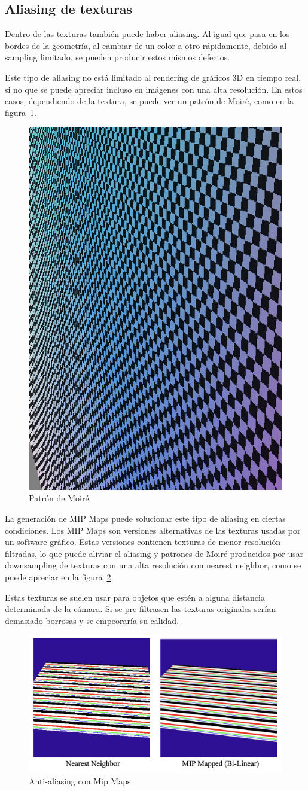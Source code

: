 \documentclass[withindex, glossary]{cam-thesis}
\begin{document}
\subsection{Aliasing de texturas}

Dentro de las texturas también puede haber aliasing. Al igual que pasa en los bordes de la geometría, al cambiar de un color a otro rápidamente, debido al sampling limitado, se pueden producir estos mismos defectos.

Este tipo de aliasing no está limitado al rendering de gráficos 3D en tiempo real, si no que se puede apreciar incluso en imágenes con una alta resolución. En estos casos, dependiendo de la textura, se puede ver un patrón de Moiré, como en la figura~\ref{moire}.

\begin{figure}[!htbp]
    \includegraphics[width=.3\linewidth]{figures/moire.png}
    \caption{Patrón de Moiré\cite{studysupersampling}\label{moire}}
\end{figure}

La generación de MIP Maps puede solucionar este tipo de aliasing en ciertas condiciones. Los MIP Maps son versiones alternativas de las texturas usadas por un software gráfico. Estas versiones contienen texturas de menor resolución filtradas, lo que puede aliviar el aliasing y patrones de Moiré producidos por usar downsampling de texturas con una alta resolución con nearest neighbor, como se puede apreciar en la figura~\ref{mipmaps}.

Estas texturas se suelen usar para objetos que estén a alguna distancia determinada de la cámara. Si se pre-filtrasen las texturas originales serían demasiado borrosas y se empeoraría su calidad.

\begin{figure}[!htbp]
    \includegraphics[width=.8\linewidth]{figures/mipmaps.png}
    \caption{Anti-aliasing con Mip Maps\label{mipmaps}}
\end{figure}
\end{document}
